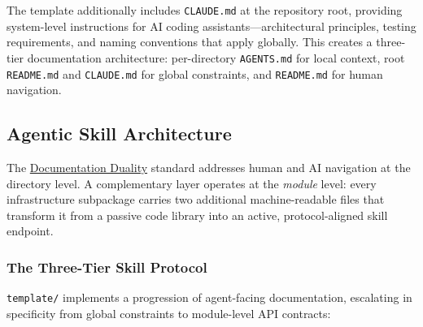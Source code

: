 \documentclass[
  english,
]{article}
\begin{document}
The template additionally includes \texttt{CLAUDE.md} at the repository
root, providing system-level instructions for AI coding
assistants---architectural principles, testing requirements, and naming
conventions that apply globally. This creates a three-tier documentation
architecture: per-directory \texttt{AGENTS.md} for local context, root
\texttt{README.md} and \texttt{CLAUDE.md} for global constraints, and
\texttt{README.md} for human navigation.

\subsection{Agentic Skill
Architecture}\label{agentic-skill-architecture}

The \hyperref[documentation-duality-and-ai-collaboration]{Documentation
Duality} standard addresses human and AI navigation at the directory
level. A complementary layer operates at the \emph{module} level: every
infrastructure subpackage carries two additional machine-readable files
that transform it from a passive code library into an active,
protocol-aligned skill endpoint.

\subsubsection{The Three-Tier Skill
Protocol}\label{the-three-tier-skill-protocol}

\texttt{template/} implements a progression of agent-facing
documentation, escalating in specificity from global constraints to
module-level API contracts:
\end{document}
